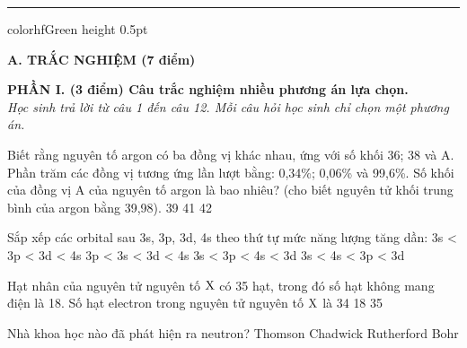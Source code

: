 \documentclass[11pt,a4paper]{article}
\begin{document}
\vspace{4pt}
\hrule color{hfGreen} height 0.5pt

\vspace{4pt}
\noindent
{\color{mainGreen}\textbf{\Large A. TRẮC NGHIỆM (7 điểm)}}

\vspace{3pt}
\noindent
{\color{mainGreen}\textbf{\large PHẦN I. (3 điểm) Câu trắc nghiệm nhiều phương án lựa chọn.}}\\
\textit{\small Học sinh trả lời từ câu 1 đến câu 12. Mỗi câu hỏi học sinh chỉ chọn một phương án.}
\vspace{2pt}

\begin{ex}
Biết rằng nguyên tố argon có ba đồng vị khác nhau, ứng với số khối 36; 38 và A. Phần trăm các đồng vị tương ứng lần lượt bằng: 0,34\%; 0,06\% và 99,6\%. Số khối của đồng vị A của nguyên tố argon là bao nhiêu? (cho biết nguyên tử khối trung bình của argon bằng 39,98).
\choice
{39}
{}
{41}
{42}

\end{ex}
\begin{ex}
Sắp xếp các orbital sau 3s, 3p, 3d, 4s theo thứ tự mức năng lượng tăng dần:
\choice
{3s < 3p < 3d < 4s}
{3p < 3s < 3d < 4s}
{\True 3s < 3p < 4s < 3d}
{3s < 4s < 3p < 3d}

\end{ex}
\begin{ex}
Hạt nhân của nguyên tử nguyên tố $\ce{X}$ có 35 hạt, trong đó số hạt không mang điện là 18. Số hạt electron trong nguyên tử nguyên tố $\ce{X}$ là
\choice
{34}
{18}
{35}
{}

\end{ex}
\begin{ex}
Nhà khoa học nào đã phát hiện ra neutron?
\choice
{Thomson}
{\True Chadwick}
{Rutherford}
{Bohr}

\end{ex}
\end{document}
